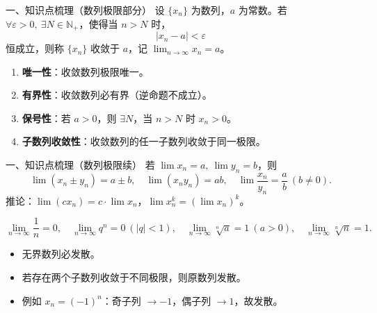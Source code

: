 \documentclass[aspectratio=169,11pt]{beamer}
\begin{document}
\begin{frame}{一、知识点梳理（数列极限部分）}
设 $\{x_n\}$ 为数列，$a$ 为常数。若 $\forall\varepsilon>0,\ \exists N\in\mathbb{N}_+$，使得当 $n>N$ 时，
\[
|x_n-a|<\varepsilon
\]
恒成立，则称 $\{x_n\}$ 收敛于 $a$，记 $\displaystyle\lim_{n\to\infty}x_n=a$。


\begin{enumerate}
  \item \textbf{唯一性}：收敛数列极限唯一。
  \item \textbf{有界性}：收敛数列必有界（逆命题不成立）。
  \item \textbf{保号性}：若 $a>0$，则 $\exists N$，当 $n>N$ 时 $x_n>0$。
  \item \textbf{子数列收敛性}：收敛数列的任一子数列收敛于同一极限。
\end{enumerate}
\end{frame}

\begin{frame}{一、知识点梳理（数列极限续）}
若 $\lim x_n=a,\ \lim y_n=b$，则
\[
\lim(x_n\pm y_n)=a\pm b,\quad \lim(x_n y_n)=ab,\quad \lim\frac{x_n}{y_n}=\frac ab\ (b\ne 0).
\]
推论：$\lim(c x_n)=c\cdot\lim x_n$，$\lim x_n^k=(\lim x_n)^k$。

\[
\lim_{n\to\infty}\frac1n=0,\quad \lim_{n\to\infty}q^n=0\ (|q|<1),\quad \lim_{n\to\infty}\sqrt[n]{a}=1\ (a>0),\quad \lim_{n\to\infty}\sqrt[n]{n}=1.
\]

\begin{itemize}
  \item 无界数列必发散。
  \item 若存在两个子数列收敛于不同极限，则原数列发散。
  \item 例如 $x_n=(-1)^n$：奇子列 $\to -1$，偶子列 $\to 1$，故发散。
\end{itemize}

\end{frame}
\end{document}
